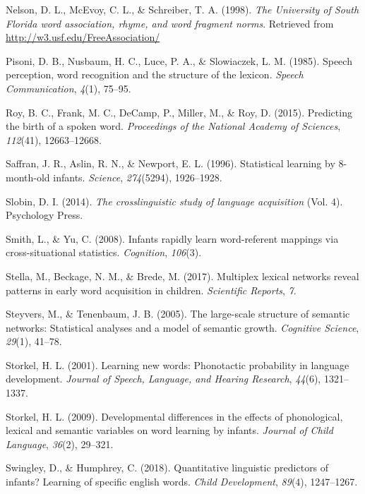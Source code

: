 \documentclass[english,floatsintext,man]{apa6}
\theoremstyle{definition}
\theoremstyle{definition}
\theoremstyle{definition}
\theoremstyle{remark}
\begin{document}
\hypertarget{ref-nelson1998}{}
Nelson, D. L., McEvoy, C. L., \& Schreiber, T. A. (1998). \emph{The
University of South Florida word association, rhyme, and word fragment
norms}. Retrieved from \url{http://w3.usf.edu/FreeAssociation/}

\hypertarget{ref-pisoni1985}{}
Pisoni, D. B., Nusbaum, H. C., Luce, P. A., \& Slowiaczek, L. M. (1985).
Speech perception, word recognition and the structure of the lexicon.
\emph{Speech Communication}, \emph{4}(1), 75--95.

\hypertarget{ref-roy2015}{}
Roy, B. C., Frank, M. C., DeCamp, P., Miller, M., \& Roy, D. (2015).
Predicting the birth of a spoken word. \emph{Proceedings of the National
Academy of Sciences}, \emph{112}(41), 12663--12668.

\hypertarget{ref-saffran1996}{}
Saffran, J. R., Aslin, R. N., \& Newport, E. L. (1996). Statistical
learning by 8-month-old infants. \emph{Science}, \emph{274}(5294),
1926--1928.

\hypertarget{ref-slobin2014}{}
Slobin, D. I. (2014). \emph{The crosslinguistic study of language
acquisition} (Vol. 4). Psychology Press.

\hypertarget{ref-smith2008}{}
Smith, L., \& Yu, C. (2008). Infants rapidly learn word-referent
mappings via cross-situational statistics. \emph{Cognition},
\emph{106}(3).

\hypertarget{ref-stella2017}{}
Stella, M., Beckage, N. M., \& Brede, M. (2017). Multiplex lexical
networks reveal patterns in early word acquisition in children.
\emph{Scientific Reports}, \emph{7}.

\hypertarget{ref-steyvers2005}{}
Steyvers, M., \& Tenenbaum, J. B. (2005). The large-scale structure of
semantic networks: Statistical analyses and a model of semantic growth.
\emph{Cognitive Science}, \emph{29}(1), 41--78.

\hypertarget{ref-storkel2001}{}
Storkel, H. L. (2001). Learning new words: Phonotactic probability in
language development. \emph{Journal of Speech, Language, and Hearing
Research}, \emph{44}(6), 1321--1337.

\hypertarget{ref-storkel2009}{}
Storkel, H. L. (2009). Developmental differences in the effects of
phonological, lexical and semantic variables on word learning by
infants. \emph{Journal of Child Language}, \emph{36}(2), 29--321.

\hypertarget{ref-swingley2018}{}
Swingley, D., \& Humphrey, C. (2018). Quantitative linguistic predictors
of infants? Learning of specific english words. \emph{Child
Development}, \emph{89}(4), 1247--1267.
\end{document}
